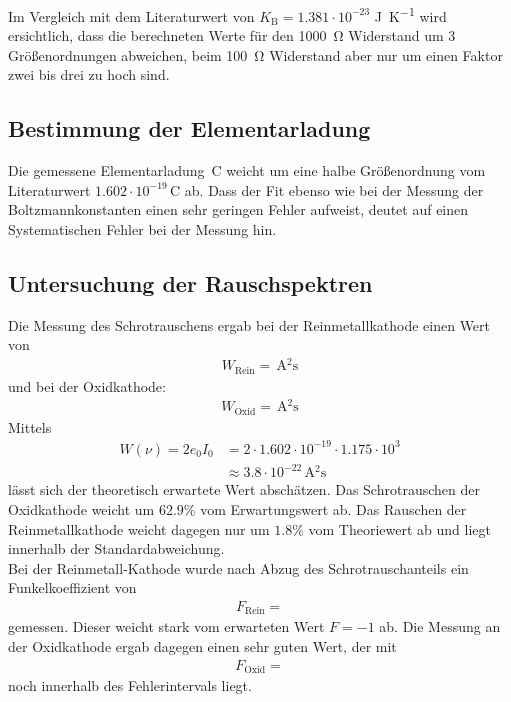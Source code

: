 Im Vergleich mit dem Literaturwert von $K_\text{B} = 1.381 \cdot 10^{-23}$ \si{\joule\per\kelvin} wird ersichtlich, dass die berechneten Werte für den \SI{1000}{\ohm} Widerstand um 3 Größenordnungen abweichen, beim \SI{100}{\ohm} Widerstand aber nur um einen Faktor zwei bis drei zu hoch sind.
\subsection{Bestimmung der Elementarladung}
Die gemessene Elementarladung $ \, \si{\coulomb}$ weicht um eine halbe Größenordnung vom Literaturwert $1.602\cdot 10^{-19}\,\si{\coulomb}$ ab. Dass der Fit ebenso wie bei der Messung der Boltzmannkonstanten einen sehr geringen Fehler aufweist, deutet auf einen Systematischen Fehler bei der Messung hin.
\subsection{Untersuchung der Rauschspektren}
Die Messung des Schrotrauschens ergab bei der Reinmetallkathode einen Wert von
\begin{align*}
W_\text{Rein} = \,\si{\ampere^2\second}
\end{align*}
und bei der Oxidkathode:
\begin{align*}
W_\text{Oxid} = \,\si{\ampere^2\second}
\end{align*}
Mittels
\begin{align*}
W(\nu) = 2e_0I_0 &= 2\cdot 1.602\cdot10^{-19}\cdot 1.175 \cdot10^{3} \\
&\approx 3.8\cdot10^{-22}\,\si{\ampere^2\second}
\end{align*}
lässt sich der theoretisch erwartete Wert abschätzen. Das Schrotrauschen der Oxidkathode weicht um $62.9\%$ vom Erwartungswert ab. Das Rauschen der Reinmetallkathode weicht dagegen nur um $1.8\%$ vom Theoriewert ab und liegt innerhalb der Standardabweichung.\\

Bei der Reinmetall-Kathode wurde nach Abzug des Schrotrauschanteils ein Funkelkoeffizient von
\begin{align*}
	F_\text{Rein} = 
\end{align*}
gemessen. Dieser weicht stark vom erwarteten Wert $F=-1$ ab. Die Messung an der Oxidkathode ergab dagegen einen sehr guten Wert, der mit
\begin{align*}
F_\text{Oxid} = 
\end{align*}
noch innerhalb des Fehlerintervals liegt.

